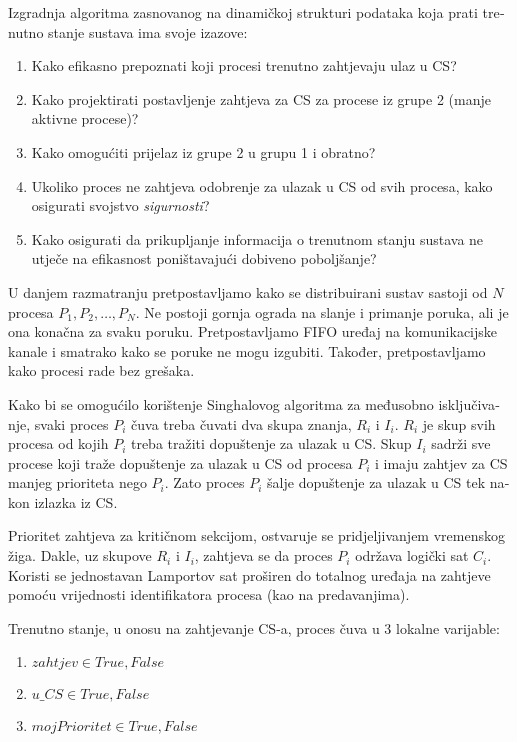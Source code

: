 \documentclass[12pt]{rectors}
\begin{document}
\begin{otherlanguage}{croatian}
Izgradnja algoritma zasnovanog na dinamičkoj strukturi podataka koja prati trenutno stanje sustava ima svoje izazove:
\begin{enumerate}
	\item Kako efikasno prepoznati koji procesi trenutno zahtjevaju ulaz u CS?
	\item Kako projektirati postavljenje zahtjeva za CS za procese iz grupe 2 (manje aktivne procese)?
	\item Kako omogućiti prijelaz iz grupe 2 u grupu 1 i obratno?
	\item Ukoliko proces ne zahtjeva odobrenje za ulazak u CS od svih procesa, kako osigurati svojstvo \textit{sigurnosti}? 
	\item Kako osigurati da prikupljanje informacija o trenutnom stanju sustava ne utječe na efikasnost poništavajući dobiveno poboljšanje?
\end{enumerate}

U danjem razmatranju pretpostavljamo kako se distribuirani sustav sastoji od $N$ procesa
$P_1, P_2, \hdots, P_N$. Ne postoji gornja ograda na slanje i primanje poruka, ali je ona konačna za svaku poruku. Pretpostavljamo FIFO uređaj na komunikacijske kanale i smatrako kako se poruke ne mogu izgubiti. Također, pretpostavljamo kako procesi rade bez grešaka.

Kako bi se omogućilo korištenje Singhalovog algoritma za međusobno isključivanje, svaki proces $P_i$ čuva treba čuvati dva skupa znanja, $R_i$ i $I_i$. $R_i$ je skup svih 
procesa od kojih $P_i$ treba tražiti dopuštenje za ulazak u CS. 
Skup $I_i$ sadrži sve procese koji traže dopuštenje za ulazak u CS od procesa $P_i$ i imaju
zahtjev za CS manjeg prioriteta nego $P_i$. Zato proces $P_i$ šalje dopuštenje za ulazak u CS tek nakon izlazka iz CS.

Prioritet zahtjeva za kritičnom sekcijom, ostvaruje se pridjeljivanjem vremenskog žiga.
Dakle, uz skupove $R_i$ i $I_i$, zahtjeva se da proces $P_i$ 
održava logički sat $C_i$. Koristi se jednostavan Lamportov sat proširen do totalnog uređaja na zahtjeve pomoću vrijednosti identifikatora procesa (kao na predavanjima).

Trenutno stanje, u onosu na zahtjevanje CS-a, proces čuva u 3 lokalne varijable: 
\begin{enumerate}
	\item $zahtjev \in {True,False}$
	\item $u\_CS \in {True,False}$
	\item $mojPrioritet \in {True,False}$
\end{enumerate} 


\end{otherlanguage}
\end{document}
